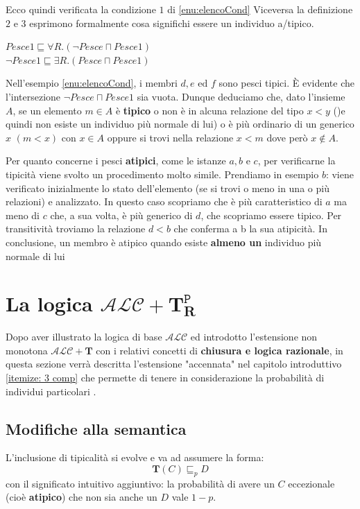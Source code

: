 Ecco quindi verificata la condizione $ 1 $ di \ref{enu:elencoCond}
Viceversa la definizione $ 2 \text{ e } 3 $ esprimono formalmente cosa significhi essere un individuo a/tipico.
\begin{multicols}{2}
	$ Pesce1 \sqsubseteq \forall R.(\neg Pesce \sqcap Pesce1) $ \\
	$ \neg Pesce1 \sqsubseteq \exists R.(Pesce \sqcap Pesce1) $
\end{multicols}
Nell'esempio \ref{enu:elencoCond}, i membri $ d,e \text{ ed } f $ sono pesci tipici. È evidente che l'intersezione
$ \neg Pesce \sqcap Pesce1 $ sia vuota. Dunque deduciamo che, dato l'insieme $ A $, se un elemento $ m \in A$ 
è \textbf{tipico} o non è in alcuna relazione del tipo $ x < y $ ()e quindi non esiste un 
individuo più normale di lui) o è più ordinario di un generico $ x $ $(m < x)$ con $ x \in A $ 
oppure si trovi nella relazione $ x < m $ dove però $ x \notin A $.

Per quanto concerne i pesci \textbf{atipici}, come le istanze $ a,b \text{ e } c $, per verificarne la tipicità 
viene svolto un procedimento molto simile. Prendiamo in esempio $ b $: viene verificato inizialmente lo stato
dell'elemento (se si trovi o meno in una o più relazioni) e analizzato. In questo caso scopriamo che è più 
caratteristico di $ a $ ma meno di $ c $ che, a sua volta, è più generico di $ d $, che scopriamo essere tipico.
Per transitività troviamo la relazione $ d < b $ che conferma a b la sua atipicità.
In conclusione, un membro è atipico quando esiste \textbf{almeno un} individuo più normale di lui

\section{La logica $ \mathcal{ALC} + \mathbf{T}_{\mathbf{R}}^{\mathtt{P}} $}
Dopo aver illustrato la logica di base $ \mathcal{ALC} $ ed introdotto l’estensione non monotona
$ \mathcal{ALC} + \mathbf{T} $ con i relativi concetti di \textbf{chiusura e logica razionale}, in questa sezione
verrà descritta l’estensione "accennata" nel capitolo introduttivo \ref{itemize: 3 comp} che permette di tenere in considerazione la probabilità di individui particolari \cite{ProbOfEx}.

\subsection{Modifiche alla semantica }
L'inclusione di tipicalità si evolve e va ad assumere la forma:
\[ \mathbf{T}(C) \sqsubseteq_{p} D \]
con il significato intuitivo aggiuntivo: la probabilità di avere un $ C $ eccezionale (cioè \textbf{atipico})
che non sia anche un $ D $ vale $ 1-p $.


